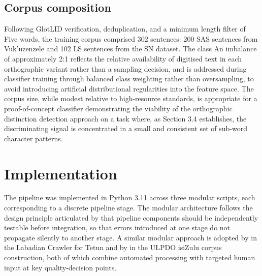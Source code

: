 \documentclass[12pt]{ThesisRU}
\begin{document}
\subsection{Corpus composition}

Following GlotLID verification, deduplication, and a minimum length filter of
Five words, the training corpus comprised 302 sentences: 200 SAS sentences
from Vuk'uzenzele and 102 LS sentences from the SN dataset. The class
An imbalance of approximately 2:1 reflects the relative availability of
digitised text in each orthographic variant rather than a sampling decision,
and is addressed during classifier training through balanced class weighting
rather than oversampling, to avoid introducing artificial distributional
regularities into the feature space. The corpus size, while modest relative
to high-resource standards, is appropriate for a proof-of-concept classifier
demonstrating the viability of the orthographic distinction detection approach
on a task where, as Section 3.4 establishes, the discriminating signal is
concentrated in a small and consistent set of sub-word character patterns. 

\section{Implementation}
The pipeline was implemented in Python 3.11 across three modular scripts, each corresponding to a discrete pipeline stage. The modular architecture follows the design principle articulated by \citet{suchomel2020better} that pipeline components should be independently testable before integration, so that errors introduced at one stage do not propagate silently to another stage. A similar modular approach is adopted by \citet{de2024data} in the Labadian Crawler for Tetun and by \citet{gumede2025creating} in the ULPDO isiZulu corpus construction, both of which combine automated processing with targeted human input at key quality-decision points.
\end{document}
